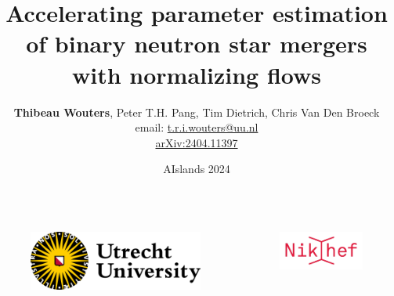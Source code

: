 \documentclass[usenames,dvipsnames,t]{beamer}
\title[\textsc{Jim} for BNS PE] %
{Accelerating parameter estimation of binary neutron star mergers with normalizing flows}
\author[Thibeau Wouters]{\small{\textbf{Thibeau Wouters}, Peter T.H. Pang, Tim Dietrich, Chris Van Den Broeck} \\ \vspace{7mm} email: \href{mailto:t.r.i.wouters@uu.nl}{t.r.i.wouters@uu.nl} \\ \vspace{7mm} \href{http://arxiv.org/abs/2404.11397}{arXiv:2404.11397}}
\date{AIslands 2024}
\begin{document}
{


\begin{frame}[plain]
\titlepage

\begin{columns}
  \begin{figure}
    \centering
    \vspace{1.5mm}
    \includegraphics[width=0.75\linewidth]{Figures/utrecht-university.png}
  \end{figure}
  \begin{figure}
    \centering
    \includegraphics[width=0.75\linewidth]{Figures/Nikhef_logo-transparent.png}
  \end{figure}
\end{columns}



\end{frame}
}
\end{document}
